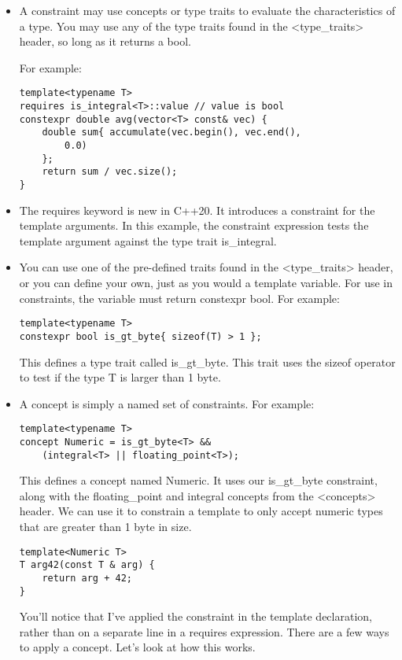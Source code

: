 \begin{itemize}
\item 
A constraint may use concepts or type traits to evaluate the characteristics of a type. You may use any of the type traits found in the <type\_traits> header, so long as it returns a bool.

For example:

\begin{lstlisting}[style=styleCXX]
template<typename T>
requires is_integral<T>::value // value is bool
constexpr double avg(vector<T> const& vec) {
	double sum{ accumulate(vec.begin(), vec.end(),
		0.0)
	};
	return sum / vec.size();
}
\end{lstlisting}

\item 
The requires keyword is new in C++20. It introduces a constraint for the template arguments. In this example, the constraint expression tests the template argument against the type trait is\_integral.

\item 
You can use one of the pre-defined traits found in the <type\_traits> header, or you can define your own, just as you would a template variable. For use in constraints, the variable must return constexpr bool. For example:

\begin{lstlisting}[style=styleCXX]
template<typename T>
constexpr bool is_gt_byte{ sizeof(T) > 1 };
\end{lstlisting}

This defines a type trait called is\_gt\_byte. This trait uses the sizeof operator to test if the type T is larger than 1 byte.

\item 
A concept is simply a named set of constraints. For example:

\begin{lstlisting}[style=styleCXX]
template<typename T>
concept Numeric = is_gt_byte<T> &&
	(integral<T> || floating_point<T>);
\end{lstlisting}

This defines a concept named Numeric. It uses our is\_gt\_byte constraint, along with the floating\_point and integral concepts from the <concepts> header. We can use it to constrain a template to only accept numeric types that are greater than 1 byte in size.

\begin{lstlisting}[style=styleCXX]
template<Numeric T>
T arg42(const T & arg) {
	return arg + 42;
}
\end{lstlisting}

You'll notice that I've applied the constraint in the template declaration, rather than on a separate line in a requires expression. There are a few ways to apply a concept. Let's look at how this works.
\end{itemize}


